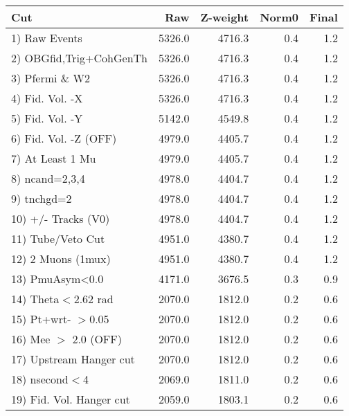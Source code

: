  \begin{table}[h!]\centering
 \begin{tabular}{||l||r|r|r|r||}
 \hline
 \hline
 Cut & Raw & Z-weight & Norm0 & Final \\
 \hline
  1) Raw Events           &      5326.0 &      4716.3 &         0.4 &         1.2 \\
  2) OBGfid,Trig+CohGenTh &      5326.0 &      4716.3 &         0.4 &         1.2 \\
  3) Pfermi \& W2         &      5326.0 &      4716.3 &         0.4 &         1.2 \\
  4) Fid. Vol. -X         &      5326.0 &      4716.3 &         0.4 &         1.2 \\
  5) Fid. Vol. -Y         &      5142.0 &      4549.8 &         0.4 &         1.2 \\
  6) Fid. Vol. -Z (OFF)   &      4979.0 &      4405.7 &         0.4 &         1.2 \\
  7) At Least 1 Mu        &      4979.0 &      4405.7 &         0.4 &         1.2 \\
  8) ncand=2,3,4          &      4978.0 &      4404.7 &         0.4 &         1.2 \\
  9) tnchgd=2             &      4978.0 &      4404.7 &         0.4 &         1.2 \\
 10) +/- Tracks (V0)      &      4978.0 &      4404.7 &         0.4 &         1.2 \\
 11) Tube/Veto Cut        &      4951.0 &      4380.7 &         0.4 &         1.2 \\
 12) 2 Muons (1mux)       &      4951.0 &      4380.7 &         0.4 &         1.2 \\
 13) PmuAsym<0.0          &      4171.0 &      3676.5 &         0.3 &         0.9 \\
 14) Theta$<$2.62 rad     &      2070.0 &      1812.0 &         0.2 &         0.6 \\
 15) Pt+wrt- $>$0.05      &      2070.0 &      1812.0 &         0.2 &         0.6 \\
 16) Mee $>$ 2.0  (OFF)   &      2070.0 &      1812.0 &         0.2 &         0.6 \\
 17) Upstream Hanger cut  &      2070.0 &      1812.0 &         0.2 &         0.6 \\
 18) nsecond$<$4          &      2069.0 &      1811.0 &         0.2 &         0.6 \\
 19) Fid. Vol. Hanger cut &      2059.0 &      1803.1 &         0.2 &         0.6 \\

\end{tabular}
\end{table}

